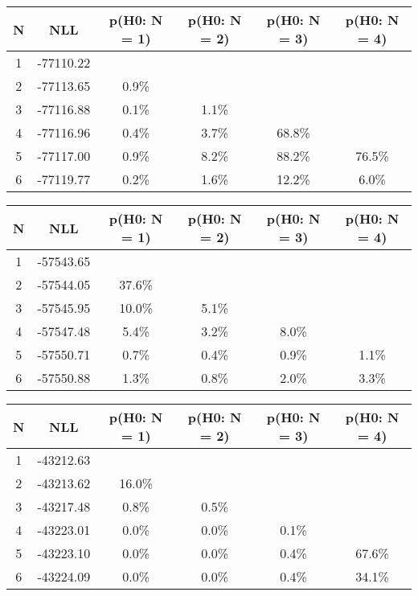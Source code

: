\begin{table}[htb]
	\begin{center}
{\footnotesize\renewcommand{\arraystretch}{1.4}
		\begin{tabular}{cc||cccc}
			N & NLL & p(H0: N = 1) & p(H0: N = 2) & p(H0: N = 3) & p(H0: N = 4)\\ 
		\hline
1 & -77110.22 & & & & \\
2 & -77113.65 & 0.9\% & & & \\
3 & -77116.88 & 0.1\% & 1.1\% & & \\
4 & -77116.96 & 0.4\% & 3.7\% & 68.8\% & \\
5 & -77117.00 & 0.9\% & 8.2\% & 88.2\% & 76.5\% \\
6 & -77119.77 & 0.2\% & 1.6\% & 12.2\% & 6.0\% \\
	\end{tabular}
		\label{tab:lab}
	}
	\end{center}\end{table}

\begin{table}[htb]
	\begin{center}
{\footnotesize\renewcommand{\arraystretch}{1.4}
		\begin{tabular}{cc||cccc}
			N & NLL & p(H0: N = 1) & p(H0: N = 2) & p(H0: N = 3) & p(H0: N = 4)\\ 
		\hline
1 & -57543.65 & & & & \\
2 & -57544.05 & 37.6\% & & & \\
3 & -57545.95 & 10.0\% & 5.1\% & & \\
4 & -57547.48 & 5.4\% & 3.2\% & 8.0\% & \\
5 & -57550.71 & 0.7\% & 0.4\% & 0.9\% & 1.1\% \\
6 & -57550.88 & 1.3\% & 0.8\% & 2.0\% & 3.3\% \\
	\end{tabular}
		\label{tab:lab}
	}
	\end{center}\end{table}

\begin{table}[htb]
	\begin{center}
{\footnotesize\renewcommand{\arraystretch}{1.4}
		\begin{tabular}{cc||cccc}
			N & NLL & p(H0: N = 1) & p(H0: N = 2) & p(H0: N = 3) & p(H0: N = 4)\\ 
		\hline
1 & -43212.63 & & & & \\
2 & -43213.62 & 16.0\% & & & \\
3 & -43217.48 & 0.8\% & 0.5\% & & \\
4 & -43223.01 & 0.0\% & 0.0\% & 0.1\% & \\
5 & -43223.10 & 0.0\% & 0.0\% & 0.4\% & 67.6\% \\
6 & -43224.09 & 0.0\% & 0.0\% & 0.4\% & 34.1\% \\
	\end{tabular}
		\label{tab:lab}
	}
	\end{center}\end{table}

